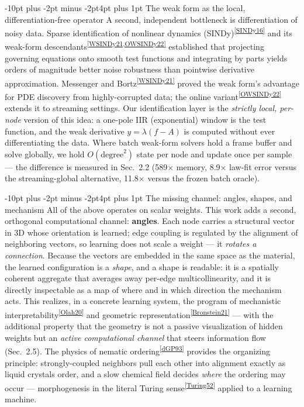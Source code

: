 \documentclass[10pt]{article}
\makeatletter
\newcommand{\natref}[1]{\textsuperscript{\ref{#1}}}
\renewcommand\subsection{\@startsection{subsection}{2}{\z@}%
  {-10pt plus -2pt minus -2pt}{4pt plus 1pt}%
  {\normalfont\bfseries\normalsize}}
\makeatother
\begin{document}
\subsection{The weak form as the local, differentiation-free operator}
A second, independent bottleneck is differentiation of noisy data. Sparse
identification of nonlinear dynamics (SINDy)\natref{SINDy16} and its weak-form
descendants\natref{WSINDy21,OWSINDy22} established that projecting governing equations
onto smooth test functions and integrating by parts yields orders of magnitude better
noise robustness than pointwise derivative approximation. Messenger and
Bortz\natref{WSINDy21} proved the weak form's advantage for PDE discovery from
highly-corrupted data; the online variant\natref{OWSINDy22} extends it to streaming
settings. Our identification layer is the \emph{strictly local, per-node} version of
this idea: a one-pole IIR (exponential) window is the test function, and the weak
derivative $y = \lambda(f - A)$ is computed without ever differentiating the data.
Where batch weak-form solvers hold a frame buffer and solve globally, we hold
$O(\mathrm{degree}^2)$ state per node and update once per sample --- the difference is
measured in Sec.~2.2 (589$\times$ memory, 8.9$\times$ law-fit error versus the
streaming-global alternative, 11.8$\times$ versus the frozen batch oracle).

\subsection{The missing channel: angles, shapes, and mechanism}
All of the above operates on scalar weights. This work adds a second, orthogonal
computational channel: \textbf{angles}. Each node carries a structural vector in 3D
whose orientation is learned; edge coupling is regulated by the alignment of neighboring
vectors, so learning does not scale a weight --- it \emph{rotates a connection}. Because
the vectors are embedded in the same space as the material, the learned configuration is
a \emph{shape}, and a shape is readable: it is a spatially coherent aggregate that
averages away per-edge multicollinearity, and it is directly inspectable as a map of
where and in which direction the mechanism acts. This realizes, in a concrete learning
system, the program of mechanistic interpretability\natref{Olah20} and geometric
representation\natref{Bronstein21} --- with the additional property that the geometry is
not a passive visualization of hidden weights but an \emph{active computational
channel} that steers information flow (Sec.~2.5). The physics of nematic
ordering\natref{dGP93} provides the organizing principle: strongly-coupled neighbors
pull each other into alignment exactly as liquid crystals order, and a slow chemical
field decides \emph{where} the ordering may occur --- morphogenesis in the literal
Turing sense\natref{Turing52} applied to a learning machine.
\end{document}
